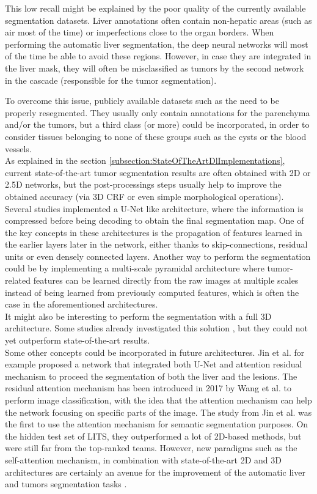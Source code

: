 This low recall might be explained by the poor quality of the
currently available segmentation datasets. Liver annotations often
contain non-hepatic areas (such as air most of the time) or
imperfections close to the organ borders.
When performing the automatic liver segmentation, the deep neural
networks will most of the time be able to avoid these regions. However,
in case they are integrated in the liver mask, they will often be
misclassified as tumors by the second network in the cascade
(responsible for the tumor segmentation).

To overcome this issue, publicly available datasets such as the
 need to be properly resegmented. They usually only contain
annotations for the parenchyma and/or the tumors, but a third class (or
more) could be incorporated, in order to consider tissues belonging to none of
these groups such as the cysts or the blood vessels.\\
As explained in the section  \ref{subsection:StateOfTheArtDlImplementations}, current state-of-the-art tumor
segmentation results are often obtained with 2D or 2.5D networks, but
the post-processings steps usually help to improve the obtained accuracy
(via 3D CRF or even simple morphological operations). Several studies
implemented a U-Net like architecture, where the information is
compressed before being decoding to obtain the final segmentation map.
One of the key concepts in these architectures is the propagation of
features learned in the earlier layers later in the network, either
thanks to skip-connections, residual units or even densely connected
layers. Another way to perform the segmentation could be by implementing a
multi-scale pyramidal architecture where tumor-related features can be
learned directly from the raw images at multiple scales instead of being
learned from previously computed features, which is often the case in
the aforementioned architectures.\\
It might also be interesting to perform the segmentation with a full 3D
architecture. Some studies already investigated this solution \cite{Dou2016}, 
but they could not yet outperform state-of-the-art results. \\
Some other concepts could be incorporated in future architectures. Jin et
al. \cite{Jin2018} for example proposed a network that integrated both U-Net and
attention residual mechanism to proceed the segmentation of both the
liver and the lesions. The residual attention mechanism has been
introduced in 2017 by Wang et al. \cite{Wang2017} to perform image
classification, with the idea that the attention mechanism can help the
network focusing on specific parts of the image. The study from Jin et
al. was the first to use the attention mechanism for
semantic segmentation purposes. On the hidden test set of LITS, they
outperformed a lot of 2D-based methods, but were still far from the
top-ranked teams. However, new paradigms such as the self-attention
mechanism, in combination with state-of-the-art 2D and 3D architectures
are certainly an avenue for the improvement of the automatic liver and
tumors segmentation tasks \cite{Chen2019}.

